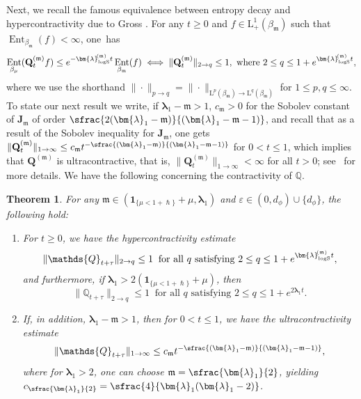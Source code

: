 \documentclass[10pt]{amsart}
\let\epsilon\varepsilon
\newcommand{\pspfrac}[2]{\sfrac{(#1)}{(#2)}}
\theoremstyle{plain}
\newtheorem{theorem}{Theorem}[section]
\theoremstyle{definition}
\DeclareMathOperator{\Ent}{Ent}
\newcommand{\J}{\mathds{Q}}
\newcommand{\Leb}{\mathrm{L}}
\newcommand{\calJd}{\mathbf{J}}
\newcommand{\m}{\mathfrak{m}}
\newcommand{\lam}{{\bm{\lambda}_1}}
\newcommand{\logSob}[1][\mo]{\bm{\lambda}_{\mathrm{logS}}^{\hspace{-0.06cm}(#1)}}
\newcommand{\Q}[1][\mo]{\mathbf{Q}^{({#1})}}
\newcommand{\gab}[1][\lam,\mo]{{\beta_{#1}}}
\let\h\hslash
\let\mo\mu
\begin{document}
Next, we recall the famous equivalence between entropy decay and hypercontracti\-vity due to Gross \cite{Gross}. For any $t\!\geq\!0$ and $f\!\in\!\Leb^1_+(\gab[\m])$ such that $\Ent_{\gab[\m]}(f)\!<\!\infty$, one~has
\begin{equation*}
\Ent_{\gab[\mo]} (\Q[\m]_tf) \leq e^{- \logSob[\m] t} \Ent_{\gab[\m]} (f) \iff \|\Q[\m]_t \|_{2 \to q} \leq 1, \textrm{ where } 2\leq q \leq 1+e^{ \logSob[\m] t},
\end{equation*}
where we use the shorthand $\|{\cdot}\|_{p \to q} = \|{\cdot}\|_{\Leb^p(\gab[\m]) \to \Leb^q(\gab[\m])}$ for $1 \leq p, q \leq \infty$. To state our next result we write, if $\lam - \m > 1$, $c_{\m} > 0$ for the Sobolev constant of $\calJd_\m$ of order $\sfrac{2(\lam-\m)}{(\lam-\m-1)}$, and recall that as a result of the Sobolev inequality for $\calJd_\m$, one gets $\|\Q[\m]_t\|_{1 \to \infty} \leq c_{\m} t^{-\pspfrac{\lam-\m}{\lam-\m-1}}$ for $0 < t \leq 1$, which implies that $\Q[\m]$ is ultracontractive,
that is, $\|\Q[\m]_t\|_{1 \to \infty} < \infty$ for all $t > 0$; see~ for more details. We have the following concerning the contractivity of $\J$.

\begin{theorem}
\label{thm:contractivity}
For any $\m \in (\bm{1}_{\{\mo < 1+\h\}} + \mo , \lam)$ and $\epsilon \in (0,d_\phi) \cup \{d_\phi\}$, the following hold:
\begin{enumerate}
\item \label{item-1:thm:contractivity} For $t \geq 0$, we have the hypercontractivity estimate
\begin{equation*}
\|\J_{t+\tau}\|_{2 \to q} \leq 1 \: \text{ for all } q \text{ satisfying } 2\leq q \leq 1+e^{ \logSob[\m] t},
\end{equation*}
and furthermore, if $\lam > 2(\bm{1}_{\{\mo < 1+\h \}} + \mo)$, then
\begin{equation*}
\|\J_{t+\tau}\|_{2 \to q} \leq 1 \: \text{ for all } q \text{ satisfying }2\leq q \leq 1+e^{2\lam t}.
\end{equation*}
\item \label{item-2:thm:contractivity} If, in addition, $\lam-\m > 1$, then for $0 < t \leq 1$, we have the ultracontractivity estimate
\begin{equation*}
\|\J_{t+\tau}\|_{1 \to \infty} \leq c_{\m} t^{-\pspfrac{\lam-\m}{\lam-\m-1}},
\end{equation*}
where for $\lam> 2$, one can choose $\m=\sfrac{\lam}{2}$, yielding $c_{\sfrac{\lam}{2}}=\sfrac{4}{\lam(\lam- 2)}$.
\end{enumerate}
\end{theorem}
\end{document}
